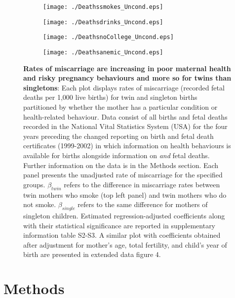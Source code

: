 \documentclass{nature}
\begin{document}
\begin{linenumbers}
\begin{spacing}{1}
\begin{figure}[htpb!]
\begin{subfigure}{.5\textwidth}
  \texttt{[image: ./Deathssmokes\_Uncond.eps]}
\end{subfigure}%
\begin{subfigure}{.5\textwidth}
  \texttt{[image: ./Deathsdrinks\_Uncond.eps]}
\end{subfigure}
\begin{subfigure}{.5\textwidth}
  \texttt{[image: ./DeathsnoCollege\_Uncond.eps]}
\end{subfigure}%
\begin{subfigure}{.5\textwidth}
  \texttt{[image: ./Deathsanemic\_Uncond.eps]}
\end{subfigure}
\vspace{5mm}
\caption{\textbf{Rates of miscarriage are increasing in poor maternal health and risky pregnancy behaviours and more so for twins than singletons}: {\footnotesize Each plot displays rates of miscarriage (recorded fetal deaths per 1,000 live births) for twin and singleton births partitioned by whether the mother has a particular condition or health-related behaviour. Data consist of all births and fetal deaths recorded in the National Vital Statistics System (USA) for the four years preceding the changed reporting on birth and fetal death certificates (1999-2002) in which information on health behaviours is available for births alongside information on \emph{and} fetal deaths. Further information on the data is in the Methods section. Each panel presents the unadjusted rate of miscarriage for the specified groups. $\beta_{twin}$ refers to the difference in miscarriage rates between twin mothers who smoke (top left panel) and twin mothers who do not smoke. $\beta_{single}$ refers to the same difference for mothers of singleton children. Estimated regression-adjusted coefficients along with their statistical significance are reported in supplementary information table S2-S3. A similar plot with coefficients obtained after adjustment for mother's age, total fertility, and child's year of birth are presented in extended data figure 4.}}
\label{fig:mech}
\end{figure}
\end{spacing}


\clearpage
\section{Methods}

\end{linenumbers}
\end{document}
